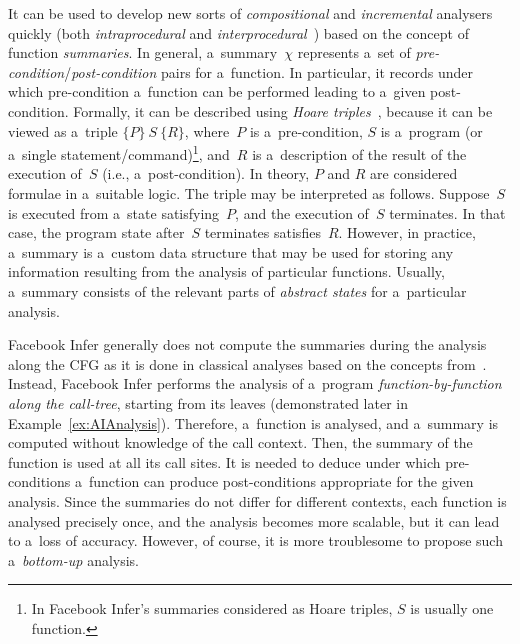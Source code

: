 It can be used to develop new sorts of \emph{compositional} and \emph{incremental} analysers quickly (both \emph{intraprocedural} and \emph{interprocedural}~\cite{programAnalysisNielson}) based on the concept of function \emph{summaries}. In general, a~summary~$ \chi $ represents a~set of \emph{pre-condition}/\emph{post-condition} pairs for a~function. In particular, it records under which pre-condition a~function can be performed leading to a~given post-condition. Formally, it can be described using \emph{Hoare triples}~\cite{hoare}, because it can be viewed as a~triple $ \{P\}\ S\ \{R\} $, where~$ P $ is a~pre-condition, $ S $ is a~program (or a~single statement/command)\footnote{In Facebook Infer's summaries considered as Hoare triples, $ S $ is usually one function.}, and~$ R $ is a~description of the result of the execution of~$ S $ (i.e., a~post-condition). In theory, $ P $ and $ R $ are considered formulae in a~suitable logic. The triple may be interpreted as follows. Suppose~$ S $ is executed from a~state satisfying~$ P $, and the execution of~$ S $ terminates. In that case, the program state after~$ S $ terminates satisfies~$ R $. However, in practice, a~summary is a~custom data structure that may be used for storing any information resulting from the analysis of particular functions. Usually, a~summary consists of the relevant parts of \emph{abstract states} for a~particular analysis.

Facebook Infer generally does not compute the summaries during the analysis along the CFG as it is done in classical analyses based on the concepts from~\cite{DFAGraphReach, DFAApproaches}. Instead, Facebook Infer performs the analysis of a~program \emph{function-by-function along the call-tree}, starting from its leaves (demonstrated later in Example~\ref{ex:AIAnalysis}). Therefore, a~function is analysed, and a~summary is computed without knowledge of the call context. Then, the summary of the function is used at all its call sites. It is needed to deduce under which pre-conditions a~function can produce post-conditions appropriate for the given analysis. Since the summaries do not differ for different contexts, each function is analysed precisely once, and the analysis becomes more scalable, but it can lead to a~loss of accuracy. However, of course, it is more troublesome to propose such a~\emph{bottom-up} analysis.

